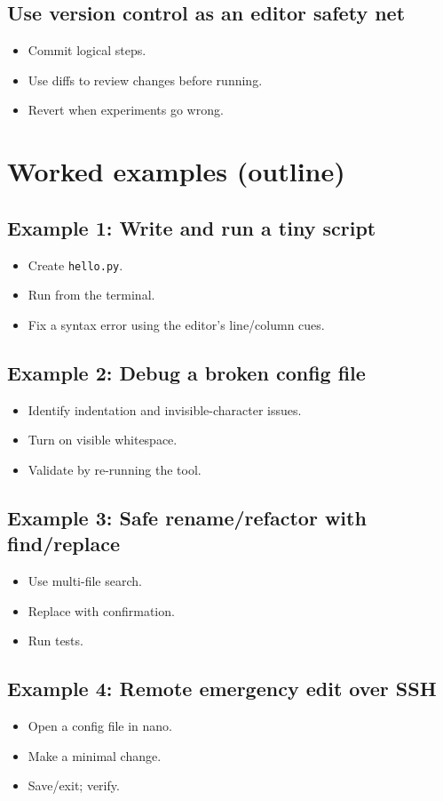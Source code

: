 \subsection{Use version control as an editor safety net}
\begin{itemize}
\item Commit logical steps.
\item Use diffs to review changes before running.
\item Revert when experiments go wrong.
\end{itemize}

\section{Worked examples (outline)}
\subsection{Example 1: Write and run a tiny script}
\begin{itemize}
\item Create \texttt{hello.py}.
\item Run from the terminal.
\item Fix a syntax error using the editor's line/column cues.
\end{itemize}

\subsection{Example 2: Debug a broken config file}
\begin{itemize}
\item Identify indentation and invisible-character issues.
\item Turn on visible whitespace.
\item Validate by re-running the tool.
\end{itemize}

\subsection{Example 3: Safe rename/refactor with find/replace}
\begin{itemize}
\item Use multi-file search.
\item Replace with confirmation.
\item Run tests.
\end{itemize}

\subsection{Example 4: Remote emergency edit over SSH}
\begin{itemize}
\item Open a config file in nano.
\item Make a minimal change.
\item Save/exit; verify.
\end{itemize}


